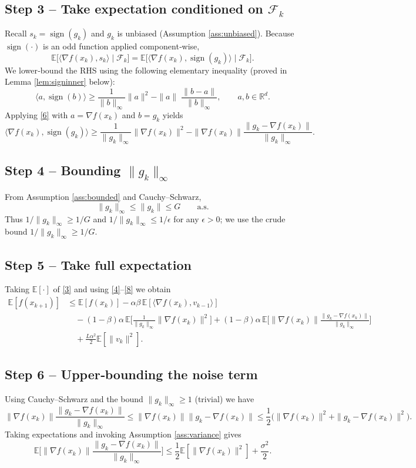 \documentclass{article}
\newcommand{\sign}{\operatorname{sign}}
\newcommand{\E}{\mathbb{E}}
\newcommand{\R}{\mathbb{R}}
\begin{document}
\subsection*{Step 3 – Take expectation conditioned on $\mathcal{F}_k$}
Recall $s_k=\sign(g_k)$ and $g_k$ is unbiased (Assumption \ref{ass:unbiased}).  
Because $\sign(\cdot)$ is an odd function applied component‑wise,
\[
\E\!\big[\langle\nabla f(x_k),s_k\rangle\mid\mathcal{F}_k\big]
= \E\!\big[\langle\nabla f(x_k),\sign(g_k)\rangle\mid\mathcal{F}_k\big].
\tag{5}
\]
We lower‑bound the RHS using the following elementary inequality (proved in Lemma \ref{lem:signinner} below):
\[
\langle a,\sign(b)\rangle\ge \frac{1}{\|b\|_{\infty}}\|a\|^{2}
-\|a\|\;\frac{\|b-a\|}{\|b\|_{\infty}},
\qquad a,b\in\R^{d}.
\tag{6}
\]
Applying \eqref{6} with $a=\nabla f(x_k)$ and $b=g_k$ yields
\[
\langle\nabla f(x_k),\sign(g_k)\rangle
\ge\frac{1}{\|g_k\|_{\infty}}\|\nabla f(x_k)\|^{2}
-\|\nabla f(x_k)\|\frac{\|g_k-\nabla f(x_k)\|}{\|g_k\|_{\infty}}.
\tag{7}
\]

\subsection*{Step 4 – Bounding $\|g_k\|_{\infty}$}
From Assumption \ref{ass:bounded} and Cauchy–Schwarz,
\[
\|g_k\|_{\infty}\le\|g_k\|\le G\qquad\text{a.s.}
\tag{8}
\]
Thus $1/\|g_k\|_{\infty}\ge 1/G$ and $1/\|g_k\|_{\infty}\le 1/\epsilon$ for any $\epsilon>0$; we use the crude bound $1/\|g_k\|_{\infty}\ge 1/G$.

\subsection*{Step 5 – Take full expectation}
Taking $\E[\cdot]$ of \eqref{3} and using \eqref{4}–\eqref{8} we obtain
\[
\begin{aligned}
\E[f(x_{k+1})]
&\le \E[f(x_k)]
-\alpha\beta\,\E[\langle\nabla f(x_k),v_{k-1}\rangle] \\
&\quad -(1-\beta)\alpha\,\E\!\Big[\frac{1}{\|g_k\|_{\infty}}\|\nabla f(x_k)\|^{2}\Big]
+ (1-\beta)\alpha\,\E\!\Big[\|\nabla f(x_k)\|\frac{\|g_k-\nabla f(x_k)\|}{\|g_k\|_{\infty}}\Big] \\
&\quad +\frac{L\alpha^{2}}{2}\E[\|v_k\|^{2}].
\end{aligned}
\tag{9}
\]

\subsection*{Step 6 – Upper‑bounding the noise term}
Using Cauchy–Schwarz and the bound $\|g_k\|_{\infty}\ge 1$ (trivial) we have
\[
\|\nabla f(x_k)\|\frac{\|g_k-\nabla f(x_k)\|}{\|g_k\|_{\infty}}
\le \|\nabla f(x_k)\|\|g_k-\nabla f(x_k)\|
\le \frac{1}{2}\big(\|\nabla f(x_k)\|^{2}+\|g_k-\nabla f(x_k)\|^{2}\big).
\tag{10}
\]
Taking expectations and invoking Assumption \ref{ass:variance} gives
\[
\E\!\Big[\|\nabla f(x_k)\|\frac{\|g_k-\nabla f(x_k)\|}{\|g_k\|_{\infty}}\Big]
\le \frac{1}{2}\E[\|\nabla f(x_k)\|^{2}]+\frac{\sigma^{2}}{2}.
\tag{11}
\]
\end{document}
